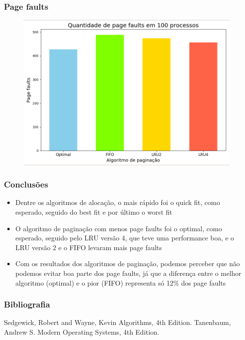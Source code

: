 \documentclass{beamer}
\begin{document}
\begin{frame}
\frametitle{Page faults}
\begin{figure}
\includegraphics[scale=0.3]{page_faults.png}
\end{figure}
\end{frame}

\begin{frame}
\frametitle{Conclusões}
\begin{itemize}
\item Dentre os algoritmos de alocação, o mais rápido foi o quick fit, como esperado, seguido do best fit e por último o worst fit
\item O algoritmo de paginação com menos page faults foi o optimal, como esperado, seguido pelo LRU versão 4, que teve uma performance boa, e o LRU versão 2 e o FIFO levaram mais page faults
\item Com os resultados dos algoritmos de paginação, podemos perceber que não podemos evitar boa parte dos page faults, já que a diferença entre o melhor algoritmo (optimal) e o pior (FIFO) representa só 12\% dos page faults
\end{itemize}

\end{frame}

\begin{frame}
\frametitle{Bibliografia}
\footnotesize {
\begin{thebibliography}{99} %
 Sedgewick, Robert and Wayne, Kevin
\newblock Algorithms, 4th Edition.
 Tanenbaum, Andrew S.
\newblock Modern Operating Systems, 4th Edition.
\end{thebibliography}
}
\end{frame}
\end{document}

